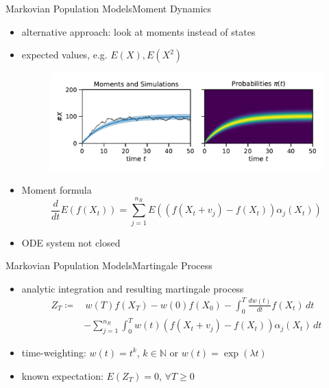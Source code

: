 \documentclass{beamer}
\newcommand{\expSym}{{E}}
\newcommand{\E}[1]{\ensuremath{\expSym\left(#1\right)}}
\renewcommand{\vec}[1]{\ensuremath{#1}}
\begin{document}
\begin{frame}{Markovian Population Models}{Moment Dynamics}
  \begin{itemize}
    \item alternative approach: look at moments instead of states
    \item expected values, e.g. $\E{X}, \E{X^2}$
    \begin{figure}
        \centering
    \includegraphics[scale=.4]{../gfx/momsandprobs.pdf}
    \end{figure}
    \item Moment formula
        \begin{equation*}
            \frac{d}{dt}\E{f({\vec{ X}}_t)} = \sum_{j=1}^{n_R}\E{\left(f({\vec X_t +
            \vec{v}_j}) - f(\vec X_t)\right)\alpha_j(\vec X_t)}
        \end{equation*}
    \item ODE system not closed
  \end{itemize}
\end{frame}

\begin{frame}{Markovian Population Models}{Martingale Process}
    \begin{itemize}
    \item analytic integration and resulting martingale process
        \begin{equation*}
            \begin{split}
            Z_T\coloneqq&\,w(T)f(\vec X_T) - w(0)f(\vec X_{0}) -
            \int_{0}^T\frac{dw(t)}{dt}f(\vec X_t)\,dt\\
            &-\sum_{j=1}^{n_R}\int_{0}^Tw(t)
                 (f(\vec X_t+\vec v_j) - f(\vec X_t))\alpha_j(\vec X_t)\,dt
         \end{split}
        \end{equation*}
    \item time-weighting: $w(t)=t^k$, $k\in\mathbb{N}$ or $w(t)=\exp(\lambda t)$
    \item known expectation: $\E{Z_T}=0$, $\forall T\geq 0$
  \end{itemize}
\end{frame}
\end{document}
